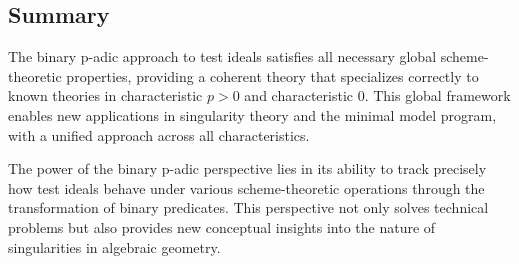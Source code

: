 \subsection{Summary}

The binary p-adic approach to test ideals satisfies all necessary global scheme-theoretic properties, providing a coherent theory that specializes correctly to known theories in characteristic $p > 0$ and characteristic 0. This global framework enables new applications in singularity theory and the minimal model program, with a unified approach across all characteristics.

The power of the binary p-adic perspective lies in its ability to track precisely how test ideals behave under various scheme-theoretic operations through the transformation of binary predicates. This perspective not only solves technical problems but also provides new conceptual insights into the nature of singularities in algebraic geometry. 